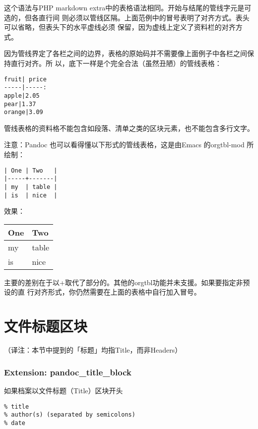 \documentclass[cn]{elegantbook}
\begin{document}
这个语法与PHP markdown
extra中的表格语法相同。开始与结尾的管线字元是可选的，但各直行间
则必须以管线区隔。上面范例中的冒号表明了对齐方式。表头可以省略，但表头下的水平虚线必须
保留，因为虚线上定义了资料栏的对齐方式。

因为管线界定了各栏之间的边界，表格的原始码并不需要像上面例子中各栏之间保持直行对齐。所
以，底下一样是个完全合法（虽然丑陋）的管线表格：

\begin{lstlisting}
fruit| price
-----|-----:
apple|2.05
pear|1.37
orange|3.09
\end{lstlisting}

管线表格的资料格不能包含如段落、清单之类的区块元素，也不能包含多行文字。

注意：Pandoc 也可以看得懂以下形式的管线表格，这是由Emacs 的orgtbl-mod
所绘制：

\begin{lstlisting}
| One | Two   |
|-----+-------|
| my  | table |
| is  | nice  |
\end{lstlisting}

效果：

\begin{longtable}[]{@{}ll@{}}
\toprule
One & Two\tabularnewline
\midrule
\endhead
my & table\tabularnewline
is & nice\tabularnewline
\bottomrule
\end{longtable}

主要的差别在于以+取代了部分的\textbar。其他的orgtbl功能并未支援。如果要指定非预设的直
行对齐形式，你仍然需要在上面的表格中自行加入冒号。

\hypertarget{ux6587ux4ef6ux6807ux9898ux533aux5757}{%
\section{文件标题区块}\label{ux6587ux4ef6ux6807ux9898ux533aux5757}}

（译注：本节中提到的「标题」均指Title，而非Headers）

\hypertarget{extension-pandoc_title_block}{%
\subsubsection{Extension:
pandoc\_title\_block}\label{extension-pandoc_title_block}}

如果档案以文件标题（Title）区块开头

\begin{lstlisting}
% title
% author(s) (separated by semicolons)
% date
\end{lstlisting}
\end{document}
